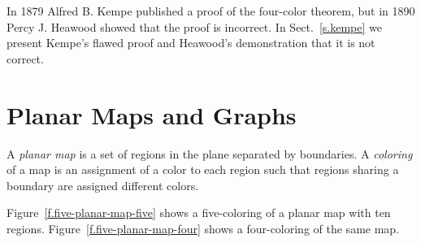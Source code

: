 In 1879 Alfred B. Kempe published a proof of the four-color theorem, but in 1890 Percy J. Heawood showed that the proof is incorrect. In Sect.~\ref{s.kempe} we present Kempe's flawed proof and Heawood's demonstration that it is not correct.

\section{Planar Maps and Graphs}\label{s.planar}

\begin{definition}
A \textit{planar map} is a set of regions in the plane separated by boundaries. A \textit{coloring} of a map is an assignment of a color to each region such that regions sharing a boundary are assigned different colors.
\end{definition}

Figure~\ref{f.five-planar-map-five} shows a five-coloring of a planar map with ten regions.
Figure~\ref{f.five-planar-map-four} shows a four-coloring of the same map.


